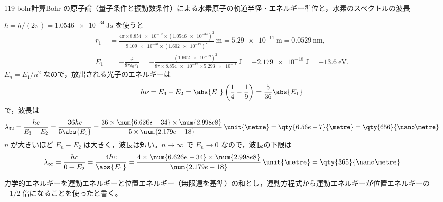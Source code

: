 \documentclass[uplatex,dvipdfmx,a4paper,11pt]{jsarticle}
\begin{document}
\begin{mondai}{119-bohr}{計算}{Bohr の原子論（量子条件と振動数条件）による水素原子の軌道半径・エネルギー準位と，水素のスペクトルの波長}
\begin{tadashii}
 $\hbar=h/(2\pi)=\qty{1.0546e-34}{\joule\second}$ を使うと
\begin{align*}
  r_{1}&=\frac{4\pi\times\num{8.854e-12}\times(\num{1.0546e-34})^{2}}{\num{9.109e-31}\times(\num{1.602e-19})^{2}}\,\unit{\metre}=\qty{5.29e-11}{\metre}=\qty{0.0529}{\nano\metre},\\
  E_{1}&=-\frac{e^{2}}{8\pi\varepsilon_{0}r_{1}}=-\frac{(\num{1.602e-19})^{2}}{8\pi\times\num{8.854e-12}\times\num{5.293e-11}}\,\unit{\joule}=\qty{-2.179e-18}{\joule}=\qty{-13.6}{\electronvolt}.
\end{align*}
 $E_{n}=E_{1}/n^{2}$ なので，放出される光子のエネルギーは
\[ h\nu=E_{3}-E_{2}=\abs{E_{1}}\left(\frac{1}{4}-\frac{1}{9}\right)=\frac{5}{36}\abs{E_{1}} \]
で，波長は
\[ \lambda_{32}=\frac{hc}{E_{3}-E_{2}}=\frac{36hc}{5\abs{E_{1}}}=\frac{36\times\num{6.626e-34}\times\num{2.998e8}}{5\times\num{2.179e-18}}\,\unit{\metre}=\qty{6.56e-7}{\metre}=\qty{656}{\nano\metre} \]
 $n$ が大きいほど $E_{n}-E_{2}$ は大きく，波長は短い。$n\to\infty$ で $E_{n}\to0$ なので，波長の下限は
\[ \lambda_{\infty}=\frac{hc}{0-E_{2}}=\frac{4hc}{\abs{E_{1}}}=\frac{4\times\num{6.626e-34}\times\num{2.998e8}}{\num{2.179e-18}}\,\unit{\metre}=\qty{365}{\nano\metre} \]
\begin{ronten}
  \item {} 力学的エネルギーを運動エネルギーと位置エネルギー（無限遠を基準）の和とし，運動方程式から運動エネルギーが位置エネルギーの $-1/2$ 倍になることを使ったと書く。

\end{ronten}
\end{tadashii}
\end{mondai}
\end{document}
